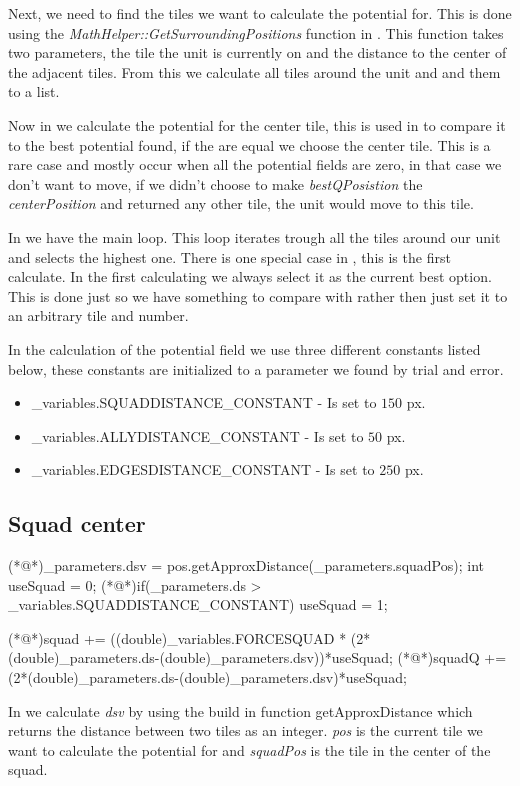     Next, we need to find the tiles we want to calculate the potential for. This is done using the \textit{MathHelper::GetSurroundingPositions}  function in . This function takes two parameters, the tile the unit is currently on and the distance to the center of the adjacent tiles. From this we calculate all tiles around the unit and and them to a list.

    Now in  we calculate the potential for the center tile, this is used in  to compare it to the best potential found, if the are equal we choose the center tile. This is a rare case and mostly occur when all the potential fields are zero, in that case we don't want to move, if we didn't choose to make \textit{bestQPosistion} the \textit{centerPosition} and returned any other tile, the unit would move to this tile.
    
    In  we have the main loop. This loop iterates trough all the tiles around our unit and selects the highest one. There is one special case in , this is the first calculate. In the first calculating we always select it as the current best option. This is done just so we have something to compare with rather then just set it to an arbitrary tile and number.
	
	    
	In the calculation of the potential field we use three different constants listed below, these constants are initialized to a parameter we found by trial and error.
	\begin{itemize}
		\item \_variables.SQUADDISTANCE\_CONSTANT - Is set to $150$ px.
		\item \_variables.ALLYDISTANCE\_CONSTANT - Is set to $50$ px.
		\item \_variables.EDGESDISTANCE\_CONSTANT - Is set to $250$ px.
	\end{itemize}
		
		
	\subsection{Squad center}	
		\begin{Sourcecode}[caption=Squad center]
(*@\lnote@*)_parameters.dsv = pos.getApproxDistance(_parameters.squadPos);	
int useSquad = 0;
(*@\lnote@*)if(_parameters.ds > _variables.SQUADDISTANCE_CONSTANT)
	useSquad = 1;

(*@\lnote@*)squad += ((double)_variables.FORCESQUAD * (2*(double)_parameters.ds-(double)_parameters.dsv))*useSquad;
(*@\lnote@*)squadQ += (2*(double)_parameters.ds-(double)_parameters.dsv)*useSquad;
\end{Sourcecode}
		In  we calculate \textit{dsv} by using the build in function getApproxDistance which returns the distance between two tiles as an integer. \textit{pos} is the current tile we want to calculate the potential for and \textit{squadPos} is the tile in the center of the squad.
		
